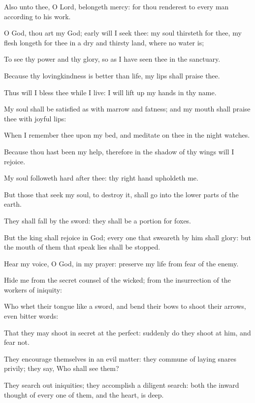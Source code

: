 \Verse Also unto thee, O Lord, belongeth mercy: for thou renderest to every man according to his work.




\Chapter
\Verse O God, thou art my God; early will I seek thee: my soul thirsteth for thee, my flesh longeth for thee in a dry and thirsty land, where no water is;

\Verse To see thy power and thy glory, so as I have seen thee in the sanctuary.

\Verse Because thy lovingkindness is better than life, my lips shall praise thee.

\Verse Thus will I bless thee while I live: I will lift up my hands in thy name.

\Verse My soul shall be satisfied as with marrow and fatness; and my mouth shall praise thee with joyful lips:

\Verse When I remember thee upon my bed, and meditate on thee in the night watches.

\Verse Because thou hast been my help, therefore in the shadow of thy wings will I rejoice.

\Verse My soul followeth hard after thee: thy right hand upholdeth me.

\Verse But those that seek my soul, to destroy it, shall go into the lower parts of the earth.

\Verse They shall fall by the sword: they shall be a portion for foxes.

\Verse But the king shall rejoice in God; every one that sweareth by him shall glory: but the mouth of them that speak lies shall be stopped.




\Chapter
\Verse Hear my voice, O God, in my prayer: preserve my life from fear of the enemy.

\Verse Hide me from the secret counsel of the wicked; from the insurrection of the workers of iniquity:

\Verse Who whet their tongue like a sword, and bend their bows to shoot their arrows, even bitter words:

\Verse That they may shoot in secret at the perfect: suddenly do they shoot at him, and fear not.

\Verse They encourage themselves in an evil matter: they commune of laying snares privily; they say, Who shall see them?

\Verse They search out iniquities; they accomplish a diligent search: both the inward thought of every one of them, and the heart, is deep.

